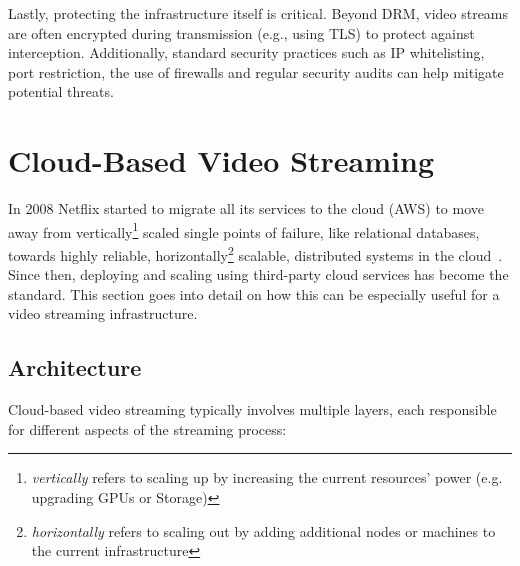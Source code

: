 Lastly, protecting the infrastructure itself is critical. Beyond DRM, video streams are often encrypted during transmission (e.g., using \ac{TLS}) to protect against interception. Additionally, standard security practices such as IP whitelisting, port restriction, the use of firewalls and regular security audits can help mitigate potential threats.

\section{Cloud-Based Video Streaming}

In 2008 Netflix started to migrate all its services to the cloud (\ac{AWS}) to move away from vertically\footnote{\textit{vertically} refers to scaling up by increasing the current resources' power (e.g. upgrading GPUs or Storage)} scaled single points of failure, like relational databases, towards highly reliable, horizontally\footnote{\textit{horizontally} refers to scaling out by adding additional nodes or machines to the current infrastructure} scalable, distributed systems in the cloud~\parencite{netflix_aws}. Since then, deploying and scaling using third-party cloud services has become the standard. This section goes into detail on how this can be especially useful for a video streaming infrastructure. 

\subsection{Architecture}
Cloud-based video streaming typically involves multiple layers, each responsible for different aspects of the streaming process:


